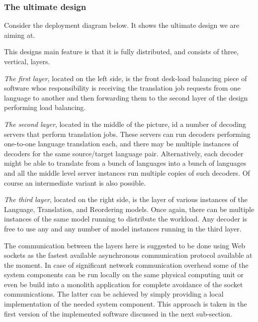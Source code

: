 \subsubsection*{The ultimate design}

Consider the deployment diagram below. It shows the ultimate design we are aiming at.



This design\textquotesingle{}s main feature is that it is fully distributed, and consists of three, vertical, layers.


\begin{DoxyEnumerate}
\item {\itshape The first layer}, located on the left side, is the front desk-\/load balancing piece of software who\textquotesingle{}s responsibility is receiving the translation job requests from one language to another and then forwarding them to the second layer of the design performing load balancing.
\item {\itshape The second layer}, located in the middle of the picture, id a number of decoding servers that perform translation jobs. These servers can run decoders performing one-\/to-\/one language translation each, and there may be multiple instances of decoders for the same source/target language pair. Alternatively, each decoder might be able to translate from a bunch of languages into a bunch of languages and all the middle level server instances run multiple copies of such decoders. Of course an intermediate variant is also possible.
\item {\itshape The third layer}, located on the right side, is the layer of various instances of the Language, Translation, and Reordering models. Once again, there can be multiple instances of the same model running to distribute the workload. Any decoder is free to use any and any number of model instances running in the third layer.
\end{DoxyEnumerate}

The communication between the layers here is suggested to be done using Web sockets as the fastest available asynchronous communication protocol available at the moment. In case of significant network communication overhead some of the system components can be run locally on the same physical computing unit or even be build into a monolith application for complete avoidance of the socket communications. The latter can be achieved by simply providing a local implementation of the needed system component. This approach is taken in the first version of the implemented software discussed in the next sub-\/section.

